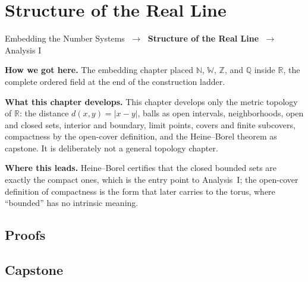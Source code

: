 \chapter{Structure of the Real Line}
\label{chap:structure-of-real-line}


\begin{tcolorbox}[
  colback=breadcrumb!8,
  colframe=breadcrumb!50,
  arc=2pt,
  left=8pt, right=8pt, top=6pt, bottom=6pt,
  title={\small\textbf{structure-of-real-line}},
  fonttitle=\small\bfseries
]
\begin{center}
\small
Embedding the Number Systems $\;\to\;$ \textbf{Structure of the Real Line} $\;\to\;$ Analysis I
\end{center}
\end{tcolorbox}

\begin{tcolorbox}[
  colback=gray!6,
  colframe=gray!40,
  arc=2pt,
  left=8pt, right=8pt, top=6pt, bottom=6pt,
  title={\small\textbf{Structural Roadmap}},
  fonttitle=\small\bfseries
]
\noindent\textbf{How we got here.}
The embedding chapter placed $\mathbb{N}$, $\mathbb{W}$, $\mathbb{Z}$, and $\mathbb{Q}$ inside $\mathbb{R}$, the complete ordered field at the end of the construction ladder.

\medskip
\noindent\textbf{What this chapter develops.}
This chapter develops only the metric topology of $\mathbb{R}$: the distance $d(x,y)=|x-y|$, balls as open intervals, neighborhoods, open and closed sets, interior and boundary, limit points, covers and finite subcovers, compactness by the open-cover definition, and the Heine--Borel theorem as capstone. It is deliberately not a general topology chapter.

\medskip
\noindent\textbf{Where this leads.}
Heine--Borel certifies that the closed bounded sets are exactly the compact ones, which is the entry point to Analysis~I; the open-cover definition of compactness is the form that later carries to the torus, where ``bounded'' has no intrinsic meaning.
\end{tcolorbox}



\section*{Proofs}


\section*{Capstone}

